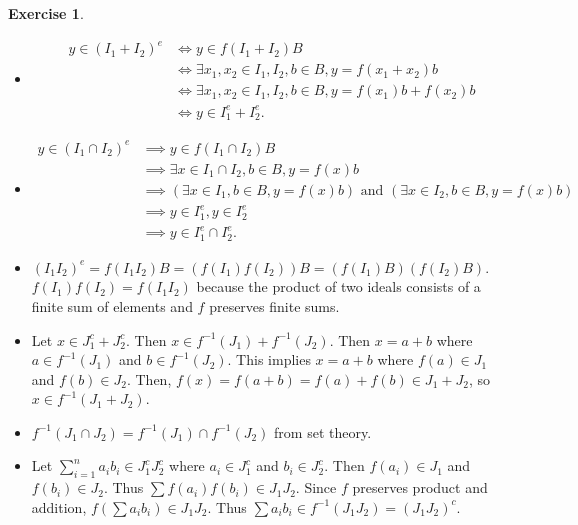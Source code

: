 \documentclass[12pt, psamsfonts]{amsart}
\theoremstyle{definition}
\newtheorem*{exer}{Exercise}
\theoremstyle{remark}
\numberwithin{equation}{section}
\begin{document}
\begin{exer}{2}
  \begin{itemize}
    \item
      \begin{align*}
        y \in (I_1 + I_2)^e
          &\iff y \in f(I_1 + I_2)B \\
          &\iff \exists x_1, x_2 \in I_1, I_2, b \in B, y = f(x_1 + x_2)b \\
          &\iff \exists x_1, x_2 \in I_1, I_2, b \in B, y = f(x_1)b + f(x_2)b \\
          &\iff y \in I_1^e + I_2^e.
      \end{align*}
    \item
      \begin{align*}
        y \in (I_1 \cap I_2)^e
          &\implies y \in f(I_1 \cap I_2)B \\
          &\implies \exists x \in I_1 \cap I_2, b \in B, y = f(x)b \\
          &\implies (\exists x \in I_1, b \in B, y = f(x)b) \text{ and } (\exists x \in I_2, b \in B, y = f(x)b) \\
          &\implies y \in I_1^e, y \in I_2^e \\
          &\implies y \in I_1^e \cap I_2^e.
      \end{align*}
    \item
      $(I_1I_2)^e = f(I_1I_2)B = (f(I_1)f(I_2))B = (f(I_1)B)(f(I_2)B)$.
      $f(I_1)f(I_2) = f(I_1I_2)$ because the product of two ideals consists of a finite sum of elements and $f$ preserves finite sums.
    \item
      Let $x \in J_1^c + J_2^c$.
      Then $x \in f^{-1}(J_1) + f^{-1}(J_2)$.
      Then $x = a + b$ where $a \in f^{-1}(J_1)$ and $b \in f^{-1}(J_2)$.
      This implies $x = a + b$ where $f(a) \in J_1$ and $f(b) \in J_2$.
      Then, $f(x) = f(a + b) = f(a) + f(b) \in J_1 + J_2$, so $x \in f^{-1}(J_1 + J_2)$.
    \item
      $f^{-1}(J_1 \cap J_2) = f^{-1}(J_1) \cap f^{-1}(J_2)$ from set theory.
    \item
      Let $\sum_{i=1}^{n} a_ib_i \in J_1^cJ_2^c$ where $a_i \in J_1^c$ and $b_i \in J_2^c$.
      Then $f(a_i) \in J_1$ and $f(b_i) \in J_2$.
      Thus $\sum f(a_i)f(b_i) \in J_1J_2$.
      Since $f$ preserves product and addition, $f(\sum a_ib_i) \in J_1J_2$.
      Thus $\sum a_ib_i \in f^{-1}(J_1J_2) = (J_1J_2)^c$.
  \end{itemize}
\end{exer}
\end{document}
